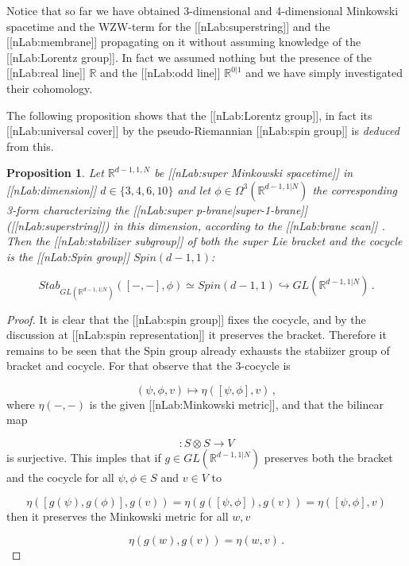 \documentclass[12pt,titlepage]{article}
\theoremstyle{plain}
\newtheorem{prop}{Proposition}
\theoremstyle{definition}
\theoremstyle{remark}
\begin{document}
Notice that so far we have obtained 3-dimensional and 4-dimensional Minkowski spacetime and the WZW-term for the [[nLab:superstring]] and the [[nLab:membrane]] propagating on it without assuming knowledge of the [[nLab:Lorentz group]]. In fact we assumed nothing but the presence of the [[nLab:real line]] $\mathbb{R}$ and the [[nLab:odd line]] $\mathbb{R}^{0|1}$ and we have simply investigated their cohomology.

The following proposition shows that the [[nLab:Lorentz group]], in fact its [[nLab:universal cover]] by the pseudo-Riemannian [[nLab:spin group]] is \emph{deduced} from this.

\begin{prop}
\label{StabilizerOfSupersymmetryJointWith3Cocycle}\hypertarget{StabilizerOfSupersymmetryJointWith3Cocycle}{}
Let $\mathbb{R}^{d-1,1,N}$ be [[nLab:super Minkowski spacetime]] in [[nLab:dimension]] $d \in \{3,4,6,10\}$ and let $\phi \in \Omega^{3}(\mathbb{R}^{d-1,1|N})$ the corresponding 3-form characterizing the [[nLab:super p-brane|super-1-brane]] ([[nLab:superstring]]) in this dimension, according to the [[nLab:brane scan]] . Then the [[nLab:stabilizer subgroup]] of both the super Lie bracket and the cocycle is the [[nLab:Spin group]] $Spin(d-1,1)$:

\begin{displaymath}
Stab_{GL(\mathbb{R}^{d-1,1|N})}([-,-], \phi)
  \simeq
  Spin(d-1,1) \hookrightarrow GL(\mathbb{R}^{d-1,1|N})
  \,.
\end{displaymath}
\end{prop}
\begin{proof}
It is clear that the [[nLab:spin group]] fixes the cocycle, and by the discussion at [[nLab:spin representation]] it preserves the bracket. Therefore it remains to be seen that the Spin group already exhausts the stabiizer group of bracket and cocycle. For that observe that the 3-cocycle is

\begin{displaymath}
(\psi,\phi, v) \mapsto \eta( [\psi,\phi], v )
  \,,
\end{displaymath}
where $\eta(-,-)$ is the given [[nLab:Minkowski metric]], and that the bilinear map

\begin{displaymath}
[-,-]\colon S \otimes S\to V
\end{displaymath}
is surjective. This imples that if $g \in GL(\mathbb{R}^{d-1,1|N})$ preserves both the bracket and the cocycle for all $\psi, \phi \in S$ and $v \in V$ to

\begin{displaymath}
\eta( [g(\psi),g(\phi)], g(v) )
  =
  \eta( g([\psi,\phi]), g(v) )
  =
  \eta( [\psi,\phi], v )
\end{displaymath}
then it preserves the Minkowski metric for all $w,v$

\begin{displaymath}
\eta(g(w), g(v)) = \eta(w,v)
  \,.
\end{displaymath}
\end{proof}
\end{document}

